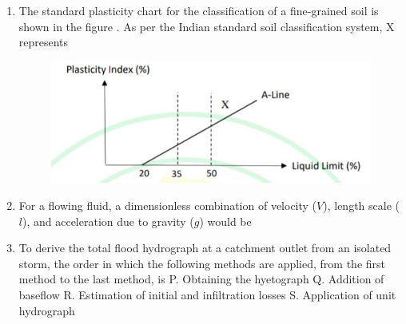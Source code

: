 \documentclass[journal,12pt,onecolumn]{article}
\theoremstyle{remark}
\begin{document}
\begin{enumerate}
\item The standard plasticity chart for the classification of a fine-grained soil is shown in the figure . As per the Indian standard soil classification system, X represents
\begin{figure}[H]
    \centering
    \includegraphics[width=0.7\columnwidth]{figs/1q-18.jpg}
    \caption{}
    \label{fig:q18}
\end{figure}

\hfill{}
\begin{enumerate}
\end{enumerate}

\item For a flowing fluid, a dimensionless combination of velocity ($V$), length scale ($l$), and acceleration due to gravity ($g$) would be

\hfill{}
\begin{enumerate}
\end{enumerate}

\item To derive the total flood hydrograph at a catchment outlet from an isolated storm, the order in which the following methods are applied, from the first method to the last method, is
P. Obtaining the hyetograph
Q. Addition of baseflow
R. Estimation of initial and infiltration losses
S. Application of unit hydrograph


\end{enumerate}
\end{document}
